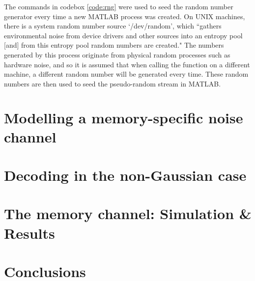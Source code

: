 \documentclass[11pt]{article}
\numberwithin{equation}{subsection}
\begin{document}
The commands in codebox \ref{code:rng} were used to seed the random number generator every time a new MATLAB process was created. On UNIX machines, there is a system random number source \mbox{`/dev/random'}, which ``gathers environmental noise from device drivers and other sources into an entropy pool [and] from this entropy pool random numbers are created." The numbers generated by this process originate from physical random processes such as hardware noise, and so it is assumed that when calling the function on a different machine, a different random number will be generated every time. These random numbers are then used to seed the pseudo-random stream in MATLAB. 

\section{Modelling a memory-specific noise channel}

\section{Decoding in the non-Gaussian case}

\section{The memory channel: Simulation \& Results}

\section{Conclusions}
\end{document}
